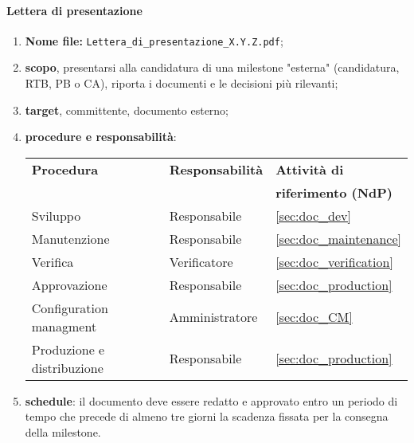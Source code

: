         \paragraph{Lettera di presentazione}
            \begin{enumerate}
                \item \textbf{Nome file:} \texttt{Lettera\_di\_presentazione\_X.Y.Z.pdf};
                \item \textbf{scopo}, presentarsi alla candidatura di una milestone "esterna" (candidatura, RTB, PB o CA), riporta i documenti e le decisioni più rilevanti;
                \item \textbf{target}, committente, documento esterno;
                \item \textbf{procedure e responsabilità}:
                \\
                \begin{tabularx}{0.93\textwidth}{|X|X|X|}
                    \hline
                    \textbf{Procedura} & \textbf{Responsabilità} & \textbf{Attività di} \\
                    & & \textbf{riferimento (NdP)} \\
                    \hline
                    Sviluppo & Responsabile &  \ref{sec:doc_dev}
                    \\\hline
                    Manutenzione & Responsabile & \ref{sec:doc_maintenance}
                    \\\hline
                    Verifica & Verificatore & \ref{sec:doc_verification}
                    \\\hline
                    Approvazione & Responsabile & \ref{sec:doc_production}
                    \\\hline
                    Configuration managment & Amministratore & \ref{sec:doc_CM}
                    \\\hline
                    Produzione e distribuzione & Responsabile & \ref{sec:doc_production}
                    \\\hline
                \end{tabularx}
                \item \textbf{schedule}: il documento deve essere redatto e approvato entro un periodo di tempo che precede di almeno tre giorni la scadenza fissata per la consegna della milestone.
            \end{enumerate} 

